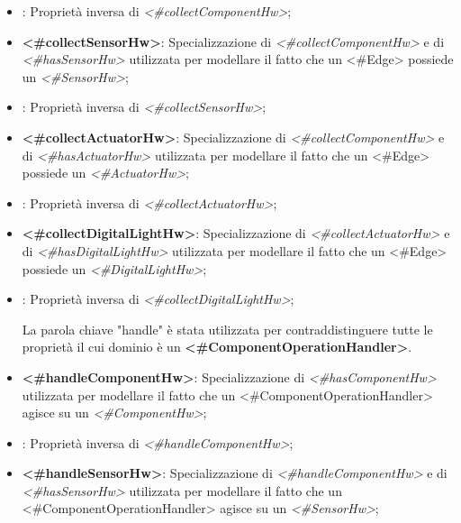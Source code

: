 \begin{itemize}
	\item {}: Proprietà inversa di \textit{<\#collectComponentHw>};

	\item \textbf{<\#collectSensorHw>}: Specializzazione di \textit{<\#collectComponentHw>} e di \textit{<\#hasSensorHw>} utilizzata per modellare il fatto che un <\#Edge> possiede un \textit{<\#SensorHw>};

	\item {}: Proprietà inversa di \textit{<\#collectSensorHw>};

	\item \textbf{<\#collectActuatorHw>}: Specializzazione di \textit{<\#collectComponentHw>} e di \textit{<\#hasActuatorHw>} utilizzata per modellare il fatto che un <\#Edge> possiede un \textit{<\#ActuatorHw>};

	\item {}: Proprietà inversa di \textit{<\#collectActuatorHw>};

	\item \textbf{<\#collectDigitalLightHw>}: Specializzazione di \textit{<\#collectActuatorHw>} e di \textit{<\#hasDigitalLightHw>} utilizzata per modellare il fatto che un <\#Edge> possiede un \textit{<\#DigitalLightHw>};

	\item {}: Proprietà inversa di \textit{<\#collectDigitalLightHw>};

\begin{info}[handle:]
	La parola chiave "handle" è stata utilizzata per contraddistinguere tutte le proprietà il cui dominio è un \textbf{<\#ComponentOperationHandler>}.
\end{info}

	\item \textbf{<\#handleComponentHw>}: Specializzazione di \textit{<\#hasComponentHw>} utilizzata per modellare il fatto che un <\#ComponentOperationHandler> agisce su un \textit{<\#ComponentHw>};

	\item {}: Proprietà inversa di \textit{<\#handleComponentHw>};

	\item \textbf{<\#handleSensorHw>}: Specializzazione di \textit{<\#handleComponentHw>} e di \textit{<\#hasSensorHw>} utilizzata per modellare il fatto che un <\#ComponentOperationHandler> agisce su un \textit{<\#SensorHw>};


\end{itemize}
